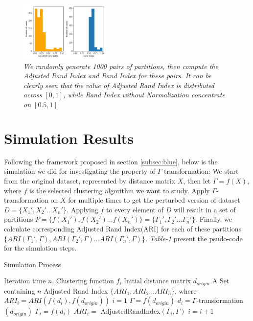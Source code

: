 \documentclass{uonmathreport}
\begin{document}
\begin{figure}[H]
 \begin{center}
   \includegraphics[width=0.4\textwidth]{adjusted.png}
 \end{center}
 \caption{\textit{We randomly generate 1000 pairs of partitions, then compute the Adjusted Rand Index and Rand Index for these pairs. It can be clearly seen that the value of Adjusted Rand Index is distributed across $[0,1]$, while Rand Index without Normalization concentrate on $[0.5,1]$}}
 \label{fig:bsd}
\end{figure}


\section{Simulation Results} \label{sec:red}
Following the framework proposed in section \ref{subsec:blue}, below is the simulation we did for investigating the property of $\Gamma$-transformation: We start from the original dataset, represented by distance matrix $X$, then let $\Gamma = f(X)$, where $f$ is the selected clustering algorithm we want to study. Apply $\Gamma$-transformation on $X$ for multiple times to get the perturbed version of dataset $D = \{X_1',X_2'\ldots X_n'\}$. Applying $f$ to every element of $D$ will result in a set of partitions $P = \{f(X_1'),f(X_2')\ldots f(X_n')\}=\{\Gamma_1',\Gamma_2' \ldots \Gamma_n' \}$. Finally, we calculate corresponding Adjusted Rand Index(ARI) for each of these partitions $\{ARI(\Gamma_1',\Gamma),ARI(\Gamma_2',\Gamma)\ldots ARI(\Gamma_n',\Gamma)\}$. \textit{Table-1} present the psudo-code for the simulation steps.

\begin{algorithm}
\label{algorithm}
    \caption{Simulation Process}
  \begin{algorithmic}[1]
    \INPUT Iteration time $n$, Clustering function $f$, Initial distance matrix $d_{origin}$
    \OUTPUT A Set containing $n$ Adjusted Rand Index $\{ARI_1,ARI_2\ldots ARI_n\}$, where $ARI_i = ARI(f(d_i),f(d_{origin}))$
	\STATE $i=1$    
    \STATE $\Gamma = f(d_{origin})$
      \STATE $d_i=\Gamma$-transformation$(d_{origin})$
      \STATE $\Gamma_i=f(d_i)$
      \STATE $ARI_i =$ AdjustedRandIndex$(\Gamma_i,\Gamma)$
      \STATE $i = i + 1$
    \ENDWHILE
  \end{algorithmic}
\end{algorithm}
\end{document}
